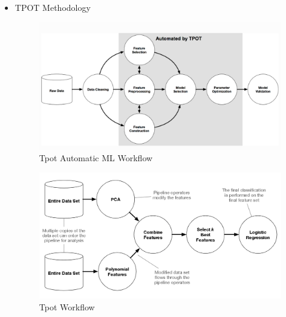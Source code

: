 \begin{itemize}
    \item TPOT Methodology
    
     \begin{figure}[!h]
    	\centering
    	\includegraphics[width=1.1\linewidth]{thesis_template/images/tpot-git-workflow.png}
    	\caption{Tpot Automatic ML Workflow}
    	\label{fig:tpot_git_workflow}
    \end{figure}
    
    \begin{figure}[!h]
    	\centering
    	\includegraphics[width=1.0\linewidth]{thesis_template/images/tpot-workflow.png}
    	\caption{Tpot  Workflow}
    	\label{fig:tpot_workflow}
    \end{figure}
    

\end{itemize}

